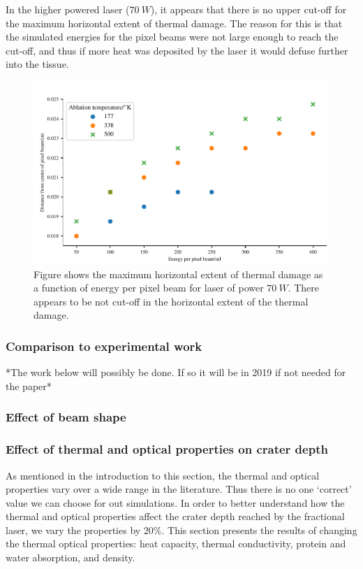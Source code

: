In the higher powered laser ($70~W$), it appears that there is no upper cut-off for the maximum horizontal extent of thermal damage. The reason for this is that the simulated energies for the pixel beams were not large enough to reach the cut-off, and thus if more heat was deposited by the laser it would defuse further into the tissue.

\begin{figure}[!h]
	\centering
	\includegraphics[width=\columnwidth]{./ablation/images/horz-70w.pdf}
	\caption{Figure shows the maximum horizontal extent of thermal damage as a function of energy per pixel beam for laser of power $70~W$. There appears to be not cut-off in the horizontal extent of the thermal damage.}
	\label{fig:horz-70}
\end{figure}

\newpage	
	
\subsubsection{Comparison to experimental work} 
 
*The work below will possibly be done. If so it will be in 2019 if not needed for the paper*
\subsubsection{Effect of beam shape}
\subsubsection{Effect of thermal and optical properties on crater depth}

As mentioned in the introduction to this section, the thermal and optical properties vary over a wide range in the literature. Thus there is no one `correct' value we can choose for out simulations. In order to better understand how the thermal and optical properties affect the crater depth reached by the fractional laser, we vary the properties by $20\%$. This section presents the results of changing the thermal optical properties: heat capacity, thermal conductivity, protein and water absorption, and density.

